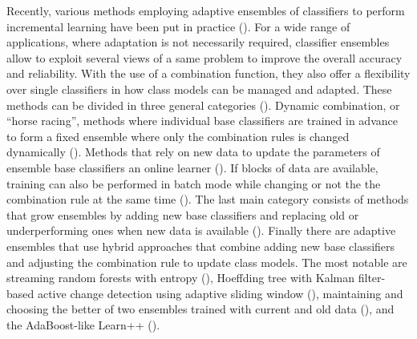Recently, various methods employing adaptive ensembles of classifiers to perform incremental learning have been put in practice (\cite{polikar01, kapp10}).
For a wide range of applications, where adaptation is not necessarily required, classifier ensembles allow to exploit several views of a same problem to improve the overall accuracy and reliability.
With the use of a combination function, they also offer a flexibility over single classifiers in how class models can be managed and adapted. 
These methods can be divided in three general categories (\cite{kuncheva04}).
Dynamic combination, or ``horse racing'', methods where individual base classifiers are trained in advance to form a fixed ensemble where only the combination rules is changed dynamically (\cite{blum97, widmer96, xingquan04}).
Methods that rely on new data to update the parameters of ensemble base classifiers an online learner (\cite{gama04}).
If blocks of data are available, training can also be performed in batch mode while changing or not the the combination rule at the same time (\cite{breiman99, ganti02, oza01, wang03}).
The last main category consists of methods that grow ensembles by adding new base classifiers and replacing old or underperforming ones when new data is available (\cite{chen01, street01, kolter07, tsymbal08}).
Finally there are adaptive ensembles that use hybrid approaches that combine adding new base classifiers and adjusting the combination rule to update class models.
The most notable are streaming random forests with entropy (\cite{abdulsalam11}), Hoeffding tree with Kalman filter-based active change detection using adaptive sliding window (\cite{bifet10}), maintaining and choosing the better of two ensembles trained with current and old data (\cite{scholz06}), and the AdaBoost-like Learn++ (\cite{polikar01}).

